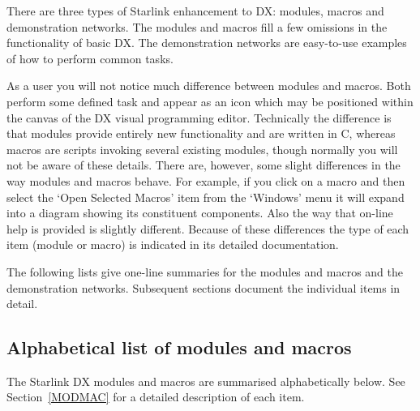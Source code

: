 There are three types of Starlink enhancement to DX: modules, macros and
demonstration networks. The modules and macros fill a few omissions in
the functionality of basic DX. The demonstration networks are
easy-to-use examples of how to perform common tasks.

As a user you will not notice much difference between modules and
macros. Both perform some defined task and appear as an icon which may
be positioned within the canvas of the DX visual programming editor.
Technically the difference is that modules provide entirely new
functionality and are written in C, whereas macros are scripts invoking
several existing modules, though normally you will not be aware of these
details. There are, however, some slight differences in the way modules
and macros behave. For example, if you click on a macro and then select
the `Open Selected Macros' item from the `Windows' menu it will expand 
into a diagram showing its constituent components. Also the way that 
on-line help is provided is slightly different. Because of these 
differences the type of each item (module or macro) is indicated in its
detailed documentation.

The following lists give one-line summaries for the modules and
macros and the demonstration networks. Subsequent sections document the
individual items in detail.

\subsection{Alphabetical list of modules and macros}

The Starlink DX modules and macros are summarised alphabetically below.
See Section~\ref{MODMAC} for a detailed description of each item.

